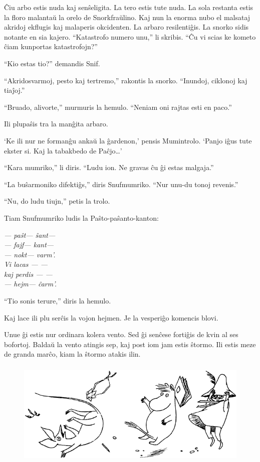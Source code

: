 Ĉiu arbo estis nuda kaj senŝeligita. La tero estis tute nuda. La sola restanta estis la floro malantaŭ la orelo de Snorkfraŭlino. Kaj nun la enorma nubo el malsataj akridoj ekflugis kaj malaperis okcidenten. La arbaro resilentiĝis. La snorko sidis notante en sia kajero. ``Katastrofo numero unu,'' li skribis. ``Ĉu vi scias ke kometo ĉiam kunportas katastrofojn?''

``Kio estas tio?'' demandis Snif.

``Akridosvarmoj, pesto kaj tertremo,'' rakontis la snorko. ``Inundoj, ciklonoj kaj tiaĵoj.''

``Bruado, alivorte,'' murmuris la hemulo. ``Neniam oni rajtas esti en paco.''

Ili plupaŝis tra la manĝita arbaro.

`Ke ili nur ne formanĝu ankaŭ la ĝardenon,' pensis Mumintrolo. `Panjo iĝus tute ekster si. Kaj la tabakbedo de Paĉjo{\ldots}'

``Kara mumriko,'' li diris. ``Ludu ion. Ne gravas ĉu ĝi estas malgaja.''

``La buŝarmoniko difektiĝs,'' diris Snufmumriko. ``Nur unu-du tonoj revenis.''

``Nu, do ludu tiujn,'' petis la trolo.

Tiam Snufmumriko ludis la Paŝto-paŝanto-kanton:

\begin{center}\itshape --- paŝt--- ŝant---\\
--- fajf--- kant---\\
--- nokt--- varm'.\\
Vi lacas --- ---\\
kaj perdis --- ---\\
--- hejm--- ĉarm'.\\\end{center}

``Tio sonis terure,'' diris la hemulo.

Kaj lace ili plu serĉis la vojon hejmen. Je la vesperiĝo komencis blovi.

Unue ĝi estis nur ordinara kolera vento. Sed ĝi senĉese fortiĝis de kvin al ses bofortoj. Baldaŭ la vento atingis sep, kaj post iom jam estis ŝtormo. Ili estis meze de granda marĉo, kiam la ŝtormo atakis ilin.

\begin{figure}[htbp]
\centering
\includegraphics[width=350pt,height=143pt]{8-6.png}
\caption{}
\label{8-6}
\end{figure}


